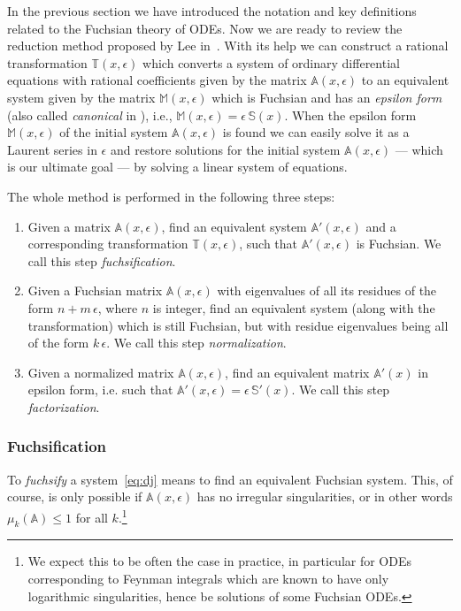 \documentclass{elsarticle}
\newcommand{\eps}{\epsilon}
\newcommand{\M}[1]{\mathbb{#1}} %
\begin{document}
In the previous section we have introduced the notation and key definitions related to the Fuchsian theory of ODEs.
Now we are ready to review the reduction method proposed by Lee in~\cite{Lee15}.
With its help we can construct a rational transformation $\M T(x,\eps)$ which converts a system of ordinary differential equations with rational coefficients given by the matrix $\M A(x,\eps)$ to an equivalent system given by the matrix $\M M(x,\eps)$ which is Fuchsian and has an \textit{epsilon form} (also called {\em canonical} in \cite{Henn13}), i.e., $\M M(x,\eps) = \eps\, \M S(x)$.
When the epsilon form $\M M(x,\eps)$ of the initial system $\M A(x,\eps)$ is found we can easily solve it as a Laurent series in $\eps$ and restore solutions for the initial system $\M A(x,\eps)$ --- which is our ultimate goal --- by solving a linear system of equations.

The whole method is performed in the following three steps:

\begin{enumerate}
    \item Given a matrix $\M A(x,\eps)$, find an equivalent system $\M A'(x,\eps)$ and a corresponding transformation $\M T(x,\eps)$, such that $\M A'(x,\eps)$ is Fuchsian. We call this step \textit{fuchsification}.
    \item Given a Fuchsian matrix $\M A(x,\eps)$ with eigenvalues of all its residues of the form $n+m\,\eps$, where $n$ is integer, find an equivalent system (along with the transformation) which is still Fuchsian, but with residue eigenvalues being all of the form $k\,\eps$. We call this step \textit{normalization}.
    \item Given a normalized matrix $\M A(x,\eps)$, find an equivalent matrix $\M A'(x)$ in epsilon form, i.e. such that $\M A'(x,\eps) = \eps \, \M S'(x)$. We call this step \textit{factorization}.
\end{enumerate}


\subsubsection{Fuchsification}
\label{sec:fuchs}

To \textit{fuchsify} a system~\eqref{eq:dj} means to find an equivalent Fuchsian system.
This, of course, is only possible if $\M A(x,\eps)$ has no irregular singularities, or in other words $\mu_k(\M A)\le1$ for all $k$.\footnote{
    We expect this to be often the case in practice, in particular for ODEs corresponding to Feynman integrals which are known to have only logarithmic singularities, hence be solutions of some Fuchsian ODEs.
}
\end{document}
